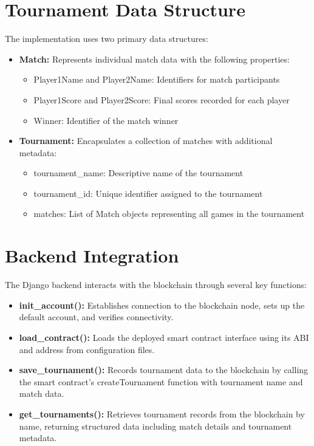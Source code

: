 \section{Tournament Data Structure}
\label{sec:data_structure}
The implementation uses two primary data structures:
\begin{itemize}
    \item \textbf{Match:} Represents individual match data with the following properties:
        \begin{itemize}
            \item Player1Name and Player2Name: Identifiers for match participants
            \item Player1Score and Player2Score: Final scores recorded for each player
            \item Winner: Identifier of the match winner
        \end{itemize}
    \item \textbf{Tournament:} Encapsulates a collection of matches with additional metadata:
        \begin{itemize}
            \item tournament\_name: Descriptive name of the tournament
            \item tournament\_id: Unique identifier assigned to the tournament
            \item matches: List of Match objects representing all games in the tournament
        \end{itemize}
\end{itemize}

\section{Backend Integration}
\label{sec:backend_integration}
The Django backend interacts with the blockchain through several key functions:
\begin{itemize}
    \item \textbf{init\_account():} Establishes connection to the blockchain node, sets up the default account, and verifies connectivity.
    \item \textbf{load\_contract():} Loads the deployed smart contract interface using its ABI and address from configuration files.
    \item \textbf{save\_tournament():} Records tournament data to the blockchain by calling the smart contract's createTournament function with tournament name and match data.
    \item \textbf{get\_tournaments():} Retrieves tournament records from the blockchain by name, returning structured data including match details and tournament metadata.
\end{itemize}

